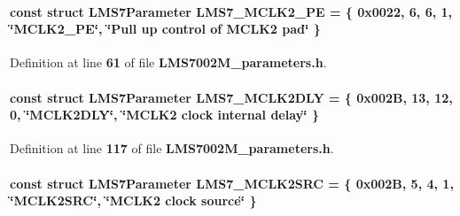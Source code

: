 \paragraph[{L\+M\+S7\+\_\+\+M\+C\+L\+K2\+\_\+\+PE}]{\setlength{\rightskip}{0pt plus 5cm}const struct {\bf L\+M\+S7\+Parameter} L\+M\+S7\+\_\+\+M\+C\+L\+K2\+\_\+\+PE = \{ 0x0022, 6, 6, 1, \char`\"{}\+M\+C\+L\+K2\+\_\+\+P\+E\char`\"{}, \char`\"{}\+Pull up control of M\+C\+L\+K2 pad\char`\"{} \}\hspace{0.3cm}{\ttfamily [static]}}\label{LMS7002M__parameters_8h_aaadac2e1ed105e1343d65a4cca047d53}


Definition at line {\bf 61} of file {\bf L\+M\+S7002\+M\+\_\+parameters.\+h}.

\paragraph[{L\+M\+S7\+\_\+\+M\+C\+L\+K2\+D\+LY}]{\setlength{\rightskip}{0pt plus 5cm}const struct {\bf L\+M\+S7\+Parameter} L\+M\+S7\+\_\+\+M\+C\+L\+K2\+D\+LY = \{ 0x002\+B, 13, 12, 0, \char`\"{}\+M\+C\+L\+K2\+D\+L\+Y\char`\"{}, \char`\"{}\+M\+C\+L\+K2 clock internal delay\char`\"{} \}\hspace{0.3cm}{\ttfamily [static]}}\label{LMS7002M__parameters_8h_a70668717b8be3d92968d9e38488d20c1}


Definition at line {\bf 117} of file {\bf L\+M\+S7002\+M\+\_\+parameters.\+h}.

\paragraph[{L\+M\+S7\+\_\+\+M\+C\+L\+K2\+S\+RC}]{\setlength{\rightskip}{0pt plus 5cm}const struct {\bf L\+M\+S7\+Parameter} L\+M\+S7\+\_\+\+M\+C\+L\+K2\+S\+RC = \{ 0x002\+B, 5, 4, 1, \char`\"{}\+M\+C\+L\+K2\+S\+R\+C\char`\"{}, \char`\"{}\+M\+C\+L\+K2 clock source\char`\"{} \}\hspace{0.3cm}{\ttfamily [static]}}\label{LMS7002M__parameters_8h_a8cc3cde07e35a6fccae94e409d04539f}


